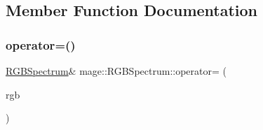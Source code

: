 \subsection{Member Function Documentation}
\hypertarget{structmage_1_1_r_g_b_spectrum_ac90d49aae8bfb98fa979d879fadd7968}{}\label{structmage_1_1_r_g_b_spectrum_ac90d49aae8bfb98fa979d879fadd7968} 
\subsubsection{\texorpdfstring{operator=()}{operator=()}}
{\footnotesize\ttfamily \hyperlink{structmage_1_1_r_g_b_spectrum}{R\+G\+B\+Spectrum}\& mage\+::\+R\+G\+B\+Spectrum\+::operator= (\begin{DoxyParamCaption}\item[{const \hyperlink{structmage_1_1_r_g_b_spectrum}{R\+G\+B\+Spectrum} \&}]{rgb }\end{DoxyParamCaption})}

